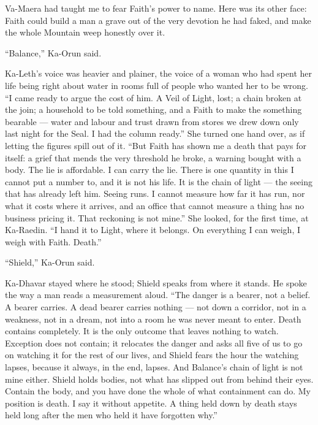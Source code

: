 Va-Maera had taught me to fear Faith's power to name. Here was its other face: Faith could build a man a grave out of the very devotion he had faked, and make the whole Mountain weep honestly over it.\par

``Balance,'' Ka-Orun said.\par

Ka-Leth's voice was heavier and plainer, the voice of a woman who had spent her life being right about water in rooms full of people who wanted her to be wrong. ``I came ready to argue the cost of him. A Veil of Light, lost; a chain broken at the join; a household to be told something, and a Faith to make the something bearable --- water and labour and trust drawn from stores we drew down only last night for the Seal. I had the column ready.'' She turned one hand over, as if letting the figures spill out of it. ``But Faith has shown me a death that pays for itself: a grief that mends the very threshold he broke, a warning bought with a body. The lie is affordable. I can carry the lie. There is one quantity in this I cannot put a number to, and it is not his life. It is the chain of light --- the seeing that has already left him. Seeing runs. I cannot measure how far it has run, nor what it costs where it arrives, and an office that cannot measure a thing has no business pricing it. That reckoning is not mine.'' She looked, for the first time, at Ka-Raedin. ``I hand it to Light, where it belongs. On everything I can weigh, I weigh with Faith. Death.''\par

``Shield,'' Ka-Orun said.\par

Ka-Dhavar stayed where he stood; Shield speaks from where it stands. He spoke the way a man reads a measurement aloud. ``The danger is a bearer, not a belief. A bearer carries. A dead bearer carries nothing --- not down a corridor, not in a weakness, not in a dream, not into a room he was never meant to enter. Death contains completely. It is the only outcome that leaves nothing to watch. Exception does not contain; it relocates the danger and asks all five of us to go on watching it for the rest of our lives, and Shield fears the hour the watching lapses, because it always, in the end, lapses. And Balance's chain of light is not mine either. Shield holds bodies, not what has slipped out from behind their eyes. Contain the body, and you have done the whole of what containment can do. My position is death. I say it without appetite. A thing held down by death stays held long after the men who held it have forgotten why.''\par

